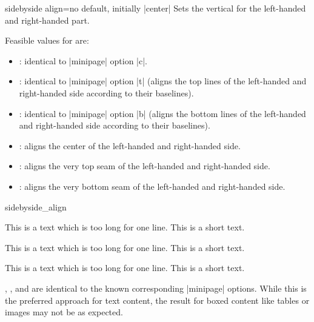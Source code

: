 \clearpage
\begin{docTcbKey}[][doc updated=2015-02-06]{sidebyside align}{=}{no default, initially |center|}
  Sets the vertical  for the left-handed and right-handed part.

  Feasible values for  are:
  \begin{itemize}
  \item{}: identical to |minipage| option |c|.
  \item{}:    identical to |minipage| option |t| (aligns the top
      lines of the left-handed and right-handed side according to their baselines).
  \item{}: identical to |minipage| option |b| (aligns the bottom
      lines of the left-handed and right-handed side according to their baselines).
  \item{}: aligns the center of the left-handed and right-handed side.
  \item{}:    aligns the very top seam of the left-handed and right-handed side.
  \item{}: aligns the very bottom seam of the left-handed and right-handed side.
  \end{itemize}

\begin{exdispExample}{sidebyside_align}

\begin{tcolorbox}[adjusted title=center,sidebyside align=center]
This is a text which is too long for one line.
\tcblower
This is a short text.
\end{tcolorbox}\hfill
\begin{tcolorbox}[adjusted title=top,sidebyside align=top]
This is a text which is too long for one line.
\tcblower
This is a short text.
\end{tcolorbox}\hfill
\begin{tcolorbox}[adjusted title=bottom,sidebyside align=bottom]
This is a text which is too long for one line.
\tcblower
This is a short text.
\end{tcolorbox}
\end{exdispExample}


, , and  are identical
to the known corresponding |minipage| options.
While this is the preferred approach for text content, the result for
boxed content like tables or images may not be as expected.


\end{docTcbKey}
